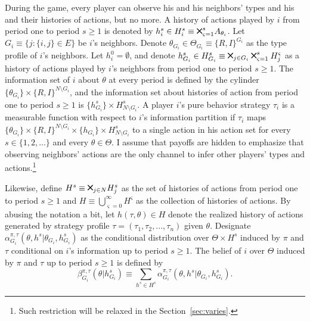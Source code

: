 \documentclass[12pt,letter]{article}
\theoremstyle{definition}
\theoremstyle{remark}
\theoremstyle{claim}
\newcommand{\bigtimes}{\mathbin{\tikz [x=1.4ex,y=1.4ex,line width=.2ex] \draw (0,0) -- (1,1) (0,1) -- (1,0);}}%
\begin{document}
During the game, every player can observe his and his neighbors' types and his and their histories of actions, but no more. A history of actions played by $i$ from period one to period $s\geq 1$ is denoted by $h^s_i\in H^s_{i}\equiv\bigtimes^s_{\varsigma =1} A_{\theta_i}$. Let $G_i\equiv \{j:\{i,j\}\in E\}$ be $i$'s neighbors. Denote $\theta_{G_i}\in \Theta_{G_i}\equiv \{R,I\}^{G_i}$ as the type profile of $i$'s neighbors. Let $h^0_i=\emptyset$, and denote $h^s_{G_i}\in H^s_{G_i}\equiv\bigtimes_{j\in G_i}\bigtimes^s_{\varsigma =1}H^{\varsigma}_j$ as a history of actions played by $i$'s neighbors from period one to period $s\geq 1$. The information set of $i$ about $\theta$ at every period is defined by the cylinder $\{\theta_{G_i}\}\times \{R,I\}^{N\setminus G_i}$, and the information set about histories of action from period one to period $s\geq 1$ is $\{h^s_{G_i}\}\times H^s_{N\setminus G_i}$. A player $i$'s pure behavior strategy $\tau_{i}$ is a measurable function with respect to $i$'s information partition if $\tau_i$ maps $\{\theta_{G_i}\}\times \{R,I\}^{N\setminus G_i}\times \{h_{G_i}\}\times H^s_{N\setminus G_i}$ to a single action in his action set for every $s\in\{1,2,...\}$ and every $\theta\in \Theta$. I assume that payoffs are hidden to emphasize that observing neighbors' actions are the only channel to infer other players' types and actions.\footnote{Such restriction will be relaxed in the Section~\ref{sec:varies}.} 

Likewise, define $H^s\equiv\bigtimes_{j\in N} H^s_{j}$ as the set of histories of actions from period one to period $s\geq 1$ and $H\equiv \bigcup^{\infty}_{\varsigma=0} H^{\varsigma}$ as the collection of histories of actions. By abusing the notation a bit, let $h({\tau},\theta)\in H$ denote the realized history of actions generated by strategy profile $\tau=(\tau_1,\tau_2,...,\tau_n)$ given $\theta$. Designate $\alpha^{\pi,\tau}_{G_i}(\theta, h^{s}|\theta_{G_i},h^{s}_{G_i})$ as the conditional distribution over $\Theta\times H^s$ induced by $\pi$ and $\tau$ conditional on $i$'s information up to period $s\geq 1$. The belief of $i$ over $\Theta$ induced by $\pi$ and $\tau$ up to period $s\geq 1$ is defined by 
\[\beta^{\pi,\tau}_{G_i}(\theta|h^{s}_{G_i})\equiv \sum_{h^{s}\in H^s}\alpha^{\pi,\tau}_{G_i}(\theta, h^{s}|\theta_{G_i},h^{s}_{G_i}).\]
\end{document}
